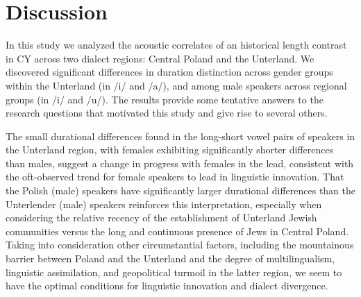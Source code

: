 \documentclass[output=paper,colorlinks,citecolor=brown]{langscibook}
\begin{document}
\section{Discussion}
\label{sec:nove:6}
In this study we analyzed the acoustic correlates of an historical length contrast in CY across two dialect regions: Central Poland and the Unterland. We discovered significant differences in duration distinction across gender groups within the Unterland (in \mbox{/i/} and \mbox{/a/}), and among male speakers across regional groups (in \mbox{/i/} and \mbox{/u/}). The results provide some tentative answers to the research questions that motivated this study and give rise to several others. 

The small durational differences found in the long-short vowel pairs of speakers in the Unterland region, with females exhibiting significantly shorter differences than males, suggest a change in progress with females in the lead, consistent with the oft-observed trend for female speakers to lead in linguistic innovation. That the Polish (male) speakers have significantly larger durational differences than the Unterlender (male) speakers reinforces this interpretation, especially when considering the relative recency of the establishment of Unterland Jewish communities versus the long and continuous presence of Jews in Central Poland. Taking into consideration other circumstantial factors, including the mountainous barrier between Poland and the Unterland and the degree of multilingualism, linguistic assimilation, and geopolitical turmoil in the latter region, we seem to have the optimal conditions for linguistic innovation and dialect divergence. 
\end{document}
